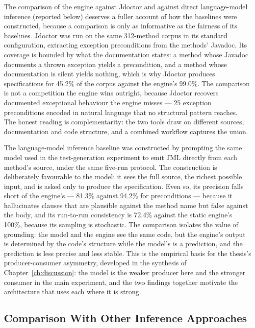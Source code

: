 The comparison of the engine against Jdoctor and against direct language-model
inference (reported below) deserves a fuller account of how the baselines were
constructed, because a comparison is only as informative as the fairness of its
baselines. Jdoctor was run on the same 312-method corpus in its standard
configuration, extracting exception preconditions from the methods' Javadoc. Its
coverage is bounded by what the documentation states: a method whose Javadoc
documents a thrown exception yields a precondition, and a method whose
documentation is silent yields nothing, which is why Jdoctor produces
specifications for 45.2\% of the corpus against the engine's 99.0\%. The
comparison is not a competition the engine wins outright, because Jdoctor recovers
documented exceptional behaviour the engine misses --- 25 exception preconditions
encoded in natural language that no structural pattern reaches. The honest reading
is complementarity: the two tools draw on different sources, documentation and
code structure, and a combined workflow captures the union.

The language-model inference baseline was constructed by prompting the same model
used in the test-generation experiment to emit JML directly from each method's
source, under the same five-run protocol. The construction is deliberately
favourable to the model: it sees the full source, the richest possible input, and
is asked only to produce the specification. Even so, its precision falls short of
the engine's --- 81.3\% against 94.2\% for preconditions --- because it
hallucinates clauses that are plausible against the method name but false against
the body, and its run-to-run consistency is 72.4\% against the static engine's
100\%, because its sampling is stochastic. The comparison isolates the value of
grounding: the model and the engine see the same code, but the engine's output is
determined by the code's structure while the model's is a prediction, and the
prediction is less precise and less stable. This is the empirical basis for the
thesis's producer-consumer asymmetry, developed in the synthesis of
Chapter~\ref{ch:discussion}: the model is the weaker producer here and the
stronger consumer in the main experiment, and the two findings together motivate
the architecture that uses each where it is strong.

\subsection{Comparison With Other Inference Approaches}

